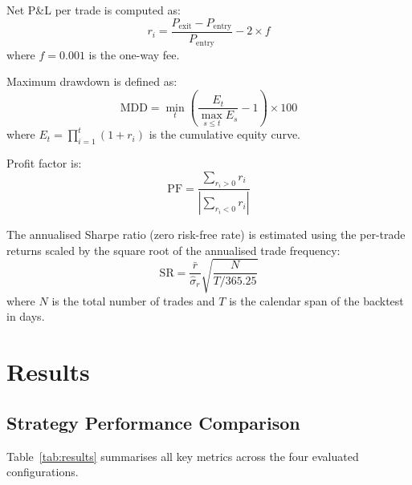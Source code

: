 \documentclass[conference]{IEEEtran}
\begin{document}
Net P\&L per trade is computed as:
\begin{equation}
  r_i = \frac{P_{\mathrm{exit}} - P_{\mathrm{entry}}}{P_{\mathrm{entry}}}
        - 2 \times f
  \label{eq:pnl}
\end{equation}
where $f = 0.001$ is the one-way fee.

Maximum drawdown is defined as:
\begin{equation}
  \mathrm{MDD} = \min_t \left( \frac{E_t}{\max_{s \leq t} E_s} - 1 \right)
  \times 100
  \label{eq:mdd}
\end{equation}
where $E_t = \prod_{i=1}^{t}(1 + r_i)$ is the cumulative
equity curve.

Profit factor is:
\begin{equation}
  \mathrm{PF} = \frac{\sum_{r_i > 0} r_i}{|\sum_{r_i < 0} r_i|}
  \label{eq:pf}
\end{equation}

The annualised Sharpe ratio (zero risk-free rate) is
estimated using the per-trade returns scaled by the
square root of the annualised trade frequency:
\begin{equation}
  \mathrm{SR} = \frac{\bar{r}}{\hat{\sigma}_r}
                \sqrt{\frac{N}{T / 365.25}}
  \label{eq:sharpe}
\end{equation}
where $N$ is the total number of trades and $T$ is the
calendar span of the backtest in days.


\section{Results}
\label{sec:results}

\subsection{Strategy Performance Comparison}

Table~\ref{tab:results} summarises all key metrics across
the four evaluated configurations.
\end{document}

